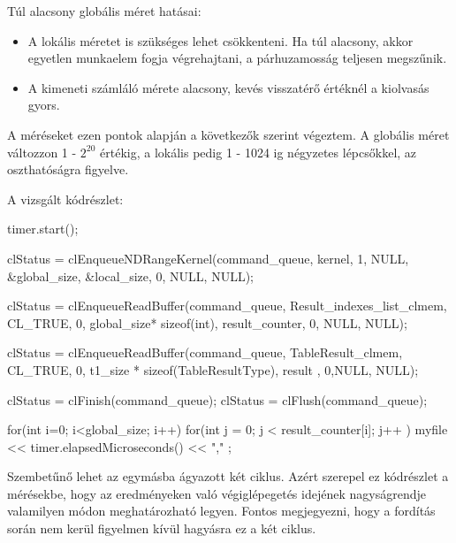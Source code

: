 Túl alacsony globális méret hatásai:
\begin{itemize}
\item A lokális méretet is szükséges lehet csökkenteni. Ha túl alacsony, akkor egyetlen munkaelem fogja végrehajtani, a párhuzamosság teljesen megszűnik.
\item A kimeneti számláló mérete alacsony, kevés visszatérő értéknél a kiolvasás gyors.
\end{itemize}
A méréseket ezen pontok alapján a következők szerint végeztem.
A globális méret változzon 1 - $2^{20}$ értékig, a lokális pedig 1 - 1024 ig négyzetes lépcsőkkel, az oszthatóságra figyelve.

A vizsgált kódrészlet:
\begin{python}  
timer.start();

clStatus = clEnqueueNDRangeKernel(command_queue, kernel, 1, NULL, 
	&global_size, &local_size, 0, NULL, NULL);

clStatus =
	clEnqueueReadBuffer(command_queue, Result_indexes_list_clmem, 
	CL_TRUE, 0, global_size* sizeof(int), 
	result_counter, 0, NULL, NULL);
	
clStatus = clEnqueueReadBuffer(command_queue, TableResult_clmem, 
	CL_TRUE, 0, t1_size * sizeof(TableResultType), 
	result  , 0,NULL, NULL);

clStatus = clFinish(command_queue);
clStatus = clFlush(command_queue);

for(int i=0; i<global_size; i++)
{
for(int j = 0; j < result_counter[i]; j++ ){}
}
myfile << timer.elapsedMicroseconds() << "," ;  
\end{python}

Szembetűnő lehet az egymásba ágyazott két ciklus. Azért szerepel ez kódrészlet a mérésekbe, hogy az eredményeken való végiglépegetés idejének nagyságrendje valamilyen módon meghatározható legyen. Fontos megjegyezni, hogy a fordítás során nem kerül figyelmen kívül hagyásra ez a két ciklus.

